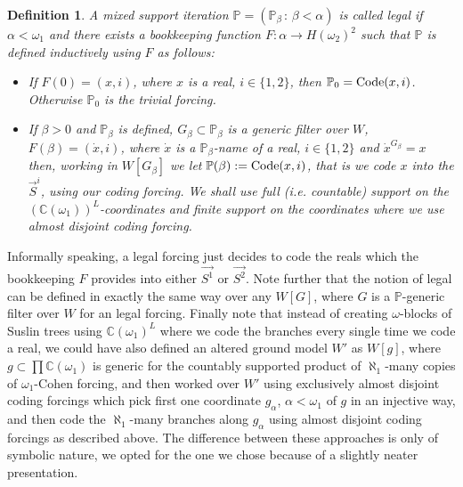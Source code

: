 \documentclass[a4paper,11pt]{article}
\newtheorem{definition}[theorem]{Definition}
\newcommand{\forceP}{\mathbb{P}}
\begin{document}
\begin{definition}
A mixed support iteration $\forceP=(\forceP_{\beta}\,:\, {\beta< \alpha})$ is called legal if $\alpha < \omega_1$ and there exists a bookkeeping function $F: \alpha \rightarrow H(\omega_2)^2$ such that 
 $\forceP$ is defined inductively using $F$ as follows:
 \begin{itemize}
 \item If $F(0)=(x,i)$, where $x$ is a real, $i\in \{1,2\}$, then $\forceP_0= \hbox{Code}({x,i} )$. Otherwise $\forceP_0$ is the trivial forcing.
 \item If $\beta>0$ and $\forceP_{\beta}$ is defined, $G_{\beta} \subset \forceP_{\beta}$ is a generic filter over $W$, $F(\beta)=(\dot{x}, i)$, where $\dot{x}$ is a $\forceP_{\beta}$-name of a real, $i \in \{1,2\}$ and $\dot{x}^{G_{\beta}}=x$ then, working in $W[G_{\beta}]$ we let
 $\forceP(\beta):= \hbox{Code} ({x,i} )$, that is we code $x$ into the $\vec{S}^i$, using our coding forcing. We shall use full (i.e. countable) support on the $(\mathbb{C}(\omega_1))^L$-coordinates and finite support on the coordinates where we use almost disjoint coding forcing.
 \end{itemize}
 
\end{definition}
 Informally speaking, a legal  forcing just decides to code the reals which the bookkeeping $F$ provides into either $\vec{S^1}$ or $\vec{S^2}$. Note further that the notion of legal  can be defined in exactly the same way over any $W[G]$, where $G$ is a $\forceP$-generic filter over $W$ for an legal  forcing. Finally note that instead of creating $\omega$-blocks of Suslin trees using $\mathbb{C} (\omega_1)^L$ where we code the branches every single time we code a real, we could have also defined an altered ground model $W'$ as $W[g]$, where $g \subset \prod \mathbb{C} (\omega_1)$ is generic for the countably supported product of $\aleph_1$-many copies of $\omega_1$-Cohen forcing, and then worked over $W'$ using exclusively almost disjoint coding forcings which pick first one coordinate $g_{\alpha}$, $\alpha< \omega_1$ of $g$ in an injective way, and then code the $\aleph_1$-many branches along $g_{\alpha}$ using almost disjoint coding forcings as described above. The difference between these approaches is only of symbolic nature, we opted for the one we chose because of a slightly neater presentation. 
 
\end{document}
